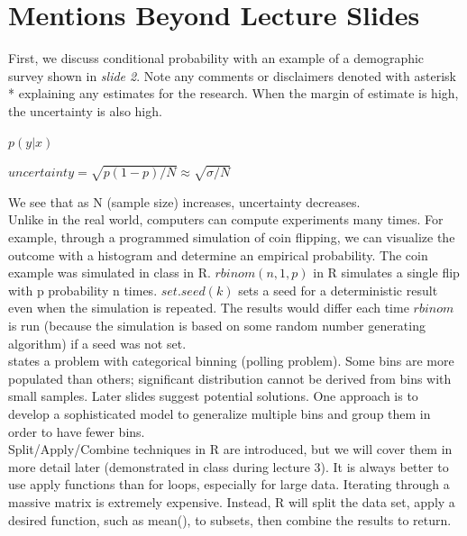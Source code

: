 
\section{Mentions Beyond Lecture Slides}
\indent First, we discuss conditional probability with an example of a demographic survey shown in {\it slide 2}. Note any comments or disclaimers denoted with asterisk * explaining any estimates for the research. When the margin of estimate is high, the uncertainty is also high. 

\begin{center}$p(y\vert x)$\end{center}
\begin{center}$uncertainty = \sqrt{p(1-p)/N} \approx \sqrt{\sigma / N}$\end{center}
We see that as N (sample size) increases, uncertainty decreases. \\

\indent Unlike in the real world, computers can compute experiments many times. For example, through a programmed simulation of coin flipping, we can visualize the outcome with a histogram and determine an empirical probability. The coin example was simulated in class in R. $rbinom(n, 1, p)$ in R simulates a single flip with p probability n times. $set.seed(k)$ sets a seed for a deterministic result even when the simulation is repeated. The results would differ each time $rbinom$ is run (because the simulation is based on some random number generating algorithm) if a seed was not set. \\

 states a problem with categorical binning (polling problem). Some bins are more populated than others; significant distribution cannot be derived from bins with small samples. Later slides suggest potential solutions. One approach is to develop a sophisticated model to generalize multiple bins and group them in order to have fewer bins. \\

\indent Split/Apply/Combine techniques in R are introduced, but we will cover them in more detail later (demonstrated in class during lecture 3). It is always better to use apply functions than for loops, especially for large data. Iterating through a massive matrix is extremely expensive. Instead, R will split the data set, apply a desired function, such as mean(), to subsets, then combine the results to return. \\

